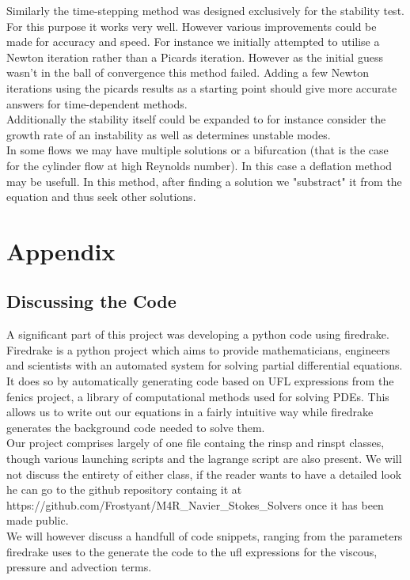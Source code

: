 \documentclass[11pt,twoside,a4paper]{article}
\begin{document}
Similarly the time-stepping method was designed exclusively for the stability test. For this purpose it works very well. However various improvements could be made for accuracy and speed. For instance we initially attempted to utilise a Newton iteration rather than a Picards iteration. However as the initial guess wasn't in the ball of convergence this method failed. Adding a few Newton iterations using the picards results as a starting point should give more accurate answers for time-dependent methods.\\
Additionally the stability itself could be expanded to for instance consider the growth rate of an instability as well as determines unstable modes.\\
In some flows we may have multiple solutions or a bifurcation (that is the case for the cylinder flow at high Reynolds number). In this case a deflation method may be usefull. In this method, after finding a solution we "substract" it from the equation and thus seek other solutions.

\section{Appendix}
\subsection{Discussing the Code}
A significant part of this project was developing a python code using firedrake.
Firedrake is a python project which aims to provide mathematicians, engineers and scientists with an automated system for solving partial differential equations.\\
It does so by automatically generating code based on UFL expressions from the fenics project, a library of computational methods used for solving PDEs. This allows us to write out our equations in a fairly intuitive way while firedrake generates the background code needed to solve them.\\
Our project comprises largely of one file containg the rinsp and rinspt classes, though various launching scripts and the lagrange script are also present. We will not discuss the entirety of either class, if the reader wants to have a detailed look he can go to the github repository containg it at https://github.com/Frostyant/M4R\_Navier\_Stokes\_Solvers once it has been made public.\\
We will however discuss a handfull of code snippets, ranging from the parameters firedrake uses to the generate the code to the ufl expressions for the viscous, pressure and advection terms.
\end{document}
